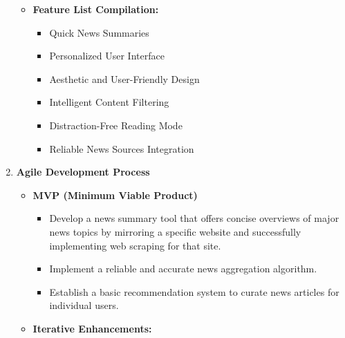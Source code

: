 \documentclass[a4paper]{article}
\begin{document}
\begin{enumerate}
    {\begin{itemize}
        \item \textbf{Feature List Compilation:}
        \begin{itemize}
            \item Quick News Summaries
            \item Personalized User Interface
            \item Aesthetic and User-Friendly Design
            \item Intelligent Content Filtering
            \item Distraction-Free Reading Mode
            \item Reliable News Sources Integration
        \end{itemize}
    \end{itemize}}
    \item \textbf{Agile Development Process}
    \begin{itemize}
        \item \textbf{MVP (Minimum Viable Product)}
        \begin{itemize}
            \item Develop a news summary tool that offers concise overviews of major news topics by mirroring a specific website and successfully implementing web scraping for that site.
            \item Implement a reliable and accurate news aggregation algorithm.
            \item Establish a basic recommendation system to curate news articles for individual users.
        \end{itemize}
        \item \textbf{Iterative Enhancements:}

\end{itemize}
\end{enumerate}
\end{document}
